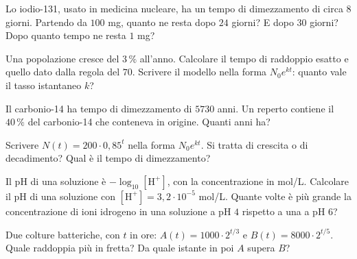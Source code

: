 \begin{esercizio}[\liv{1}]
Lo iodio-131, usato in medicina nucleare, ha un tempo di dimezzamento di circa $8$ giorni. Partendo da $100$ mg, quanto ne resta dopo $24$ giorni? E dopo $30$ giorni? Dopo quanto tempo ne resta $1$ mg?
\end{esercizio}

\begin{esercizio}[\liv{2}]
Una popolazione cresce del $3\,\%$ all'anno. Calcolare il tempo di raddoppio esatto e quello dato dalla regola del $70$. Scrivere il modello nella forma $N_0e^{kt}$: quanto vale il tasso istantaneo $k$?
\end{esercizio}

\begin{esercizio}[\liv{2}]
Il carbonio-14 ha tempo di dimezzamento di $5730$ anni. Un reperto contiene il $40\,\%$ del carbonio-14 che conteneva in origine. Quanti anni ha?
\end{esercizio}

\begin{esercizio}[\liv{2}]
Scrivere $N(t)=200\cdot0{,}85^{t}$ nella forma $N_0e^{kt}$. Si tratta di crescita o di decadimento? Qual è il tempo di dimezzamento?
\end{esercizio}

\begin{esercizio}[\liv{2}]
Il pH di una soluzione è $-\log_{10}[\mathrm H^+]$, con la concentrazione in mol/L. Calcolare il pH di una soluzione con $[\mathrm H^+]=3{,}2\cdot10^{-5}$ mol/L. Quante volte è più grande la concentrazione di ioni idrogeno in una soluzione a pH $4$ rispetto a una a pH $6$?
\end{esercizio}

\begin{esercizio}[\liv{3}]
Due colture batteriche, con $t$ in ore: $A(t)=1000\cdot2^{t/3}$ e $B(t)=8000\cdot2^{t/5}$. Quale raddoppia più in fretta? Da quale istante in poi $A$ supera $B$?
\end{esercizio}

